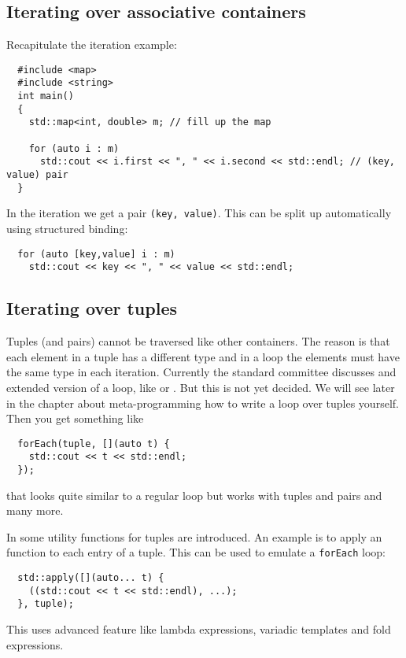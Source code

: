 \subsection{Iterating over associative containers}
Recapitulate the iteration example:
\begin{verbatim}
  #include <map>
  #include <string>
  int main()
  {
    std::map<int, double> m; // fill up the map

    for (auto i : m)
      std::cout << i.first << ", " << i.second << std::endl; // (key, value) pair
  }
\end{verbatim}
In the iteration we get a pair \texttt{(key, value)}. This can be split up automatically using structured binding:
\begin{verbatim}
  for (auto [key,value] i : m)
    std::cout << key << ", " << value << std::endl;
\end{verbatim}

\subsection{Iterating over tuples}
Tuples (and pairs) cannot be traversed like other containers. The reason is that each element in a tuple has a different type and in a loop the elements must have the same type in each iteration. Currently the standard committee discusses and extended version of a loop, like  or . But this is not yet decided. We will see later in the chapter about meta-programming how to write a loop over tuples yourself. Then you get something like
\begin{verbatim}
  forEach(tuple, [](auto t) {
    std::cout << t << std::endl;
  });
\end{verbatim}
that looks quite similar to a regular loop but works with tuples and pairs and many more.

In  some utility functions for tuples are introduced. An example is  to apply an function to each entry of a tuple. This can be used to emulate a \texttt{forEach} loop:
\begin{verbatim}
  std::apply([](auto... t) {
    ((std::cout << t << std::endl), ...);
  }, tuple);
\end{verbatim}
This uses advanced feature like lambda expressions, variadic templates and fold expressions.